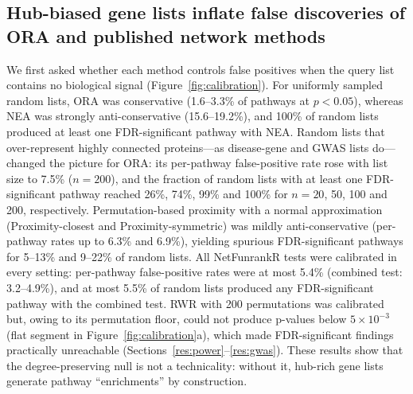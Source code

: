 \subsection{Hub-biased gene lists inflate false discoveries of ORA and published network methods}\label{res:calibration}
We first asked whether each method controls false positives when the query list contains no biological signal (Figure~\ref{fig:calibration}). For uniformly sampled random lists, ORA was conservative (1.6--3.3\% of pathways at $p<0.05$), whereas NEA was strongly anti-conservative (15.6--19.2\%), and 100\% of random lists produced at least one FDR-significant pathway with NEA. Random lists that over-represent highly connected proteins---as disease-gene and GWAS lists do---changed the picture for ORA: its per-pathway false-positive rate rose with list size to 7.5\% ($n = 200$), and the fraction of random lists with at least one FDR-significant pathway reached 26\%, 74\%, 99\% and 100\% for $n = 20$, 50, 100 and 200, respectively. Permutation-based proximity with a normal approximation (Proximity-closest and Proximity-symmetric) was mildly anti-conservative (per-pathway rates up to 6.3\% and 6.9\%), yielding spurious FDR-significant pathways for 5--13\% and 9--22\% of random lists. All NetFunrankR tests were calibrated in every setting: per-pathway false-positive rates were at most 5.4\% (combined test: 3.2--4.9\%), and at most 5.5\% of random lists produced any FDR-significant pathway with the combined test. RWR with 200 permutations was calibrated but, owing to its permutation floor, could not produce p-values below $5\times10^{-3}$ (flat segment in Figure~\ref{fig:calibration}a), which made FDR-significant findings practically unreachable (Sections~\ref{res:power}--\ref{res:gwas}). These results show that the degree-preserving null is not a technicality: without it, hub-rich gene lists generate pathway ``enrichments'' by construction.

